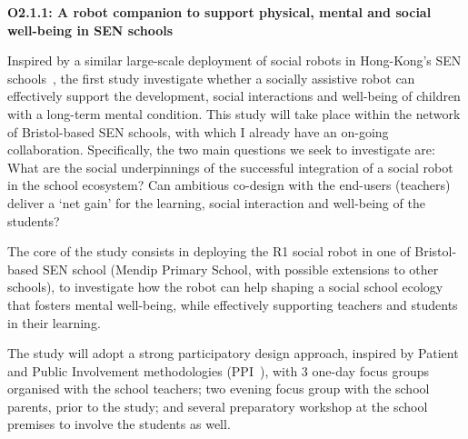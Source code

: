 \begin{rewrite}

\textbf{O2.1.1: A robot companion to support physical, mental and social
well-being in SEN schools}

Inspired by a similar large-scale deployment of social robots in Hong-Kong's SEN
schools~\cite{robot4sen}, the first study investigate whether a socially
assistive robot can effectively support the development, social
interactions and well-being of children with a long-term mental condition. This
study will take place within the network of Bristol-based SEN schools, with
which I already have an on-going collaboration.  Specifically, the two main
questions we seek to investigate are: What are the social underpinnings of the
successful integration of a social robot in the school ecosystem? Can ambitious
co-design with the end-users (teachers) deliver a `net gain' for the learning,
social interaction and well-being of the students? 

The core of the study consists in deploying the R1 social robot in one of
Bristol-based SEN school (Mendip Primary School, with possible extensions to
other schools), to investigate how the robot can help shaping a social school
ecology that fosters mental well-being, while effectively supporting teachers
and students in their learning. 

The study will adopt a strong participatory design approach, inspired by
Patient and Public Involvement methodologies (PPI~\cite{boivin2010patient}),
with 3 one-day focus groups organised with the school teachers; two evening focus group with the
school parents, prior to the study; and several preparatory workshop at the
school premises to involve the students as well.




\end{rewrite}
